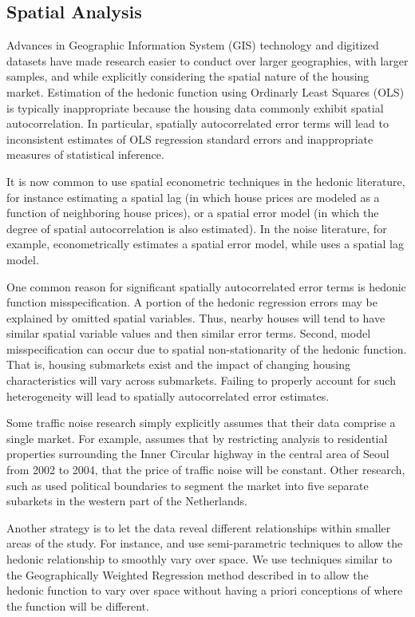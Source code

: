 \documentclass{article}\usepackage{graphicx, color}
\begin{document}
\subsection{Spatial Analysis}
Advances in Geographic Information System (GIS) technology and digitized datasets have made research easier to conduct over larger geographies, with larger samples, and while explicitly considering the spatial nature of the housing market. Estimation of the hedonic function using Ordinarly Least Squares (OLS) is typically inappropriate because the housing data commonly exhibit spatial autocorrelation. In particular, spatially autocorrelated error terms will lead to inconsistent estimates of OLS regression standard errors and inappropriate measures of statistical inference. 

It is now common to use spatial econometric techniques in the hedonic literature, for instance estimating a spatial lag (in which house prices are modeled as a function of neighboring house prices), or a spatial error model (in which the degree of spatial autocorrelation is also estimated). In the noise literature, for example, \citet{Theebe2004a} econometrically estimates a spatial error model, while \citet{Andersson2010} uses a spatial lag model.

One common reason for significant spatially autocorrelated error terms is hedonic function misspecification. A portion of the hedonic regression errors may be explained by omitted spatial variables. Thus, nearby houses will tend to have similar spatial variable values and then similar error terms. Second, model misspecification can occur due to spatial non-stationarity of the hedonic function. That is, housing submarkets exist and the impact of changing housing characteristics will vary across submarkets. Failing to properly account for such heterogeneity will lead to spatially autocorrelated error estimates.

Some traffic noise research simply explicitly assumes that their data comprise a single market. For example, \citet{Kim2007} assumes that by restricting analysis to residential properties surrounding the Inner Circular highway in the central area of Seoul from 2002 to 2004, that the price of traffic noise will be constant. Other research, such as \citet{Theebe2004a} used political boundaries to segment the market into five separate subarkets in the western part of the Netherlands.

Another strategy is to let the data reveal different relationships within smaller areas of the study. For instance, \citet{Day2007} and \citet{MarmolejoDuarteCarlos;GonzalezTamez2009} use semi-parametric techniques to allow the hedonic relationship to smoothly vary over space. We use techniques similar to the Geographically Weighted Regression method described in \citet{MarmolejoDuarteCarlos;GonzalezTamez2009} to allow the hedonic function to vary over space without having a priori conceptions of where the function will be different. 
\end{document}
